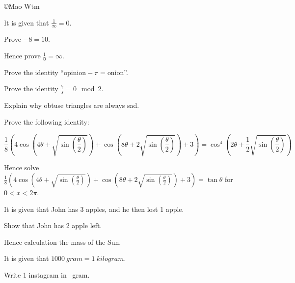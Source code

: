 \documentclass{cie}
\begin{document}
  \copyright{Mao Wtm \ccbysa}
  \subject{MATHEMATICS (FUNNIER)}
  \coverpage

  \begin{question}
    It is given that $\frac{1}{\infty} = 0$.

    \subquestion Prove $-8 = 10$. 
    \writinglinesfor{5cm}

    \subquestion Hence prove $\frac{1}{0} = \infty$. 
    \writinglinestillvfill
    \printtotalmark
    \newpage
  \end{question}

  \begin{question}
    \subquestion Prove the identity ``$\text{opinion} - \pi = \text{onion}$''.  
    \writinglinesfor{3cm}

    \subquestion Prove the identity $\frac{7}{s} = 0 \mod 2$. 
    \writinglinesfor{6cm}

    \subquestion Explain why obtuse triangles are always sad. 
    \writinglinestillvfill
    \printtotalmark
    \newpage
  \end{question}

  \begin{question}
    \subquestion Prove the following identity: 

    $$\frac{1}{8} \left (4 \cos \left (4 \theta + \sqrt{ \sin \left (\frac{\theta}{2} \right ) } \right ) + \cos \left (8 \theta + 2 \sqrt{ \sin \left (\frac{\theta}{2} \right ) } \right ) + 3 \right ) =
      \cos^4 \left (2 \theta + \frac{1}{2} \sqrt{ \sin \left (\frac{\theta}{2} \right ) } \right )$$

    \writinglinestillvfill
    \newpage

    \subquestion Hence solve $\frac{1}{8} \left (4 \cos \left (4 \theta + \sqrt{ \sin \left (\frac{\theta}{2} \right ) } \right ) + \cos \left (8 \theta + 2 \sqrt{ \sin \left (\frac{\theta}{2} \right ) } \right ) + 3 \right )
      = \tan \theta$
      for $0 < x < 2\pi$. 
    \writinglinesfor{8cm}

    \printtotalmark
  \end{question}

  \begin{question}
    It is given that John has 3 apples, and he then lost 1 apple.

    \subquestion Show that John has 2 apple left. 
    \writinglinesfor{2cm}

    \subquestion Hence calculation the mass of the Sun. 
    \writinglinestillvfill
    \newpage

    It is given that $\SI{1000}{gram} = \SI{1}{kilogram}$.

    \subquestion Write 1 instagram in \SI{}{gram}. 
    \writinglinesfor{3cm}

    \printtotalmark
  \end{question}

  \finalstuff
\end{document}
